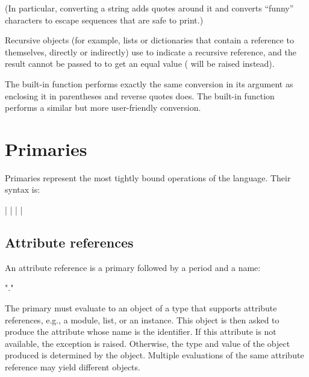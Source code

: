 (In particular, converting a string adds quotes around it and converts
``funny'' characters to escape sequences that are safe to print.)

Recursive objects (for example, lists or dictionaries that contain a
reference to themselves, directly or indirectly) use  to
indicate a recursive reference, and the result cannot be passed to
 to get an equal value ( will
be raised instead).

The built-in function  performs exactly the same
conversion in its argument as enclosing it in parentheses and reverse
quotes does.  The built-in function  performs a
similar but more user-friendly conversion.


\section{Primaries\label{primaries}}

Primaries represent the most tightly bound operations of the language.
Their syntax is:

\begin{productionlist}
             { | 
              |  |  | }
\end{productionlist}


\subsection{Attribute references\label{attribute-references}}

An attribute reference is a primary followed by a period and a name:

\begin{productionlist}
             { "." }
\end{productionlist}

The primary must evaluate to an object of a type that supports
attribute references, e.g., a module, list, or an instance.  This
object is then asked to produce the attribute whose name is the
identifier.  If this attribute is not available, the exception
 is raised.
Otherwise, the type and value of the object produced is determined by
the object.  Multiple evaluations of the same attribute reference may
yield different objects.


